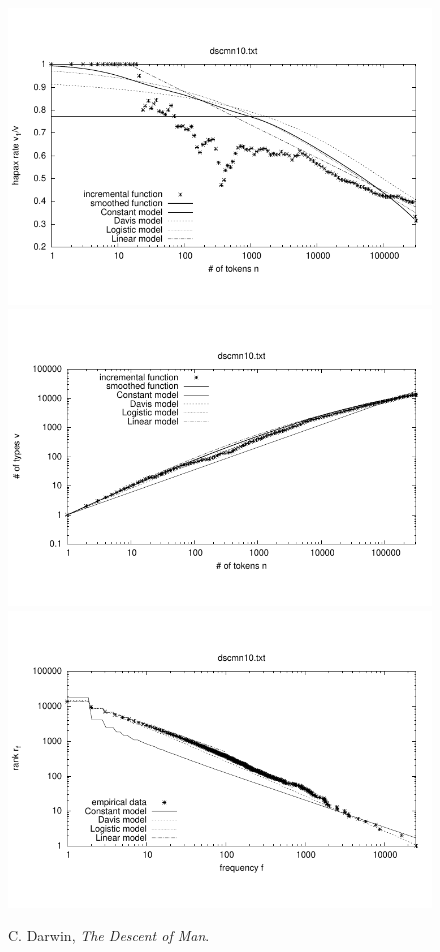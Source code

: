 \documentclass[a4paper,12pt]{article}
\begin{document}

\begin{figure}[p]
  \centering
  \vspace{-2em}
  \includegraphics[width=0.8\columnwidth]{output/herdan/dscmn10_27/token_ratio.pdf}
  \\[-3em]
  \includegraphics[width=0.8\columnwidth]{output/herdan/dscmn10_27/token_type.pdf}
  \\[-3em]
  \includegraphics[width=0.8\columnwidth]{output/herdan/dscmn10_27/frequency_rank.pdf}
  \vspace{-2em}
  \caption{C. Darwin, \emph{The Descent of Man}.\label{figdscmn10F}}
\end{figure}
\end{document}
